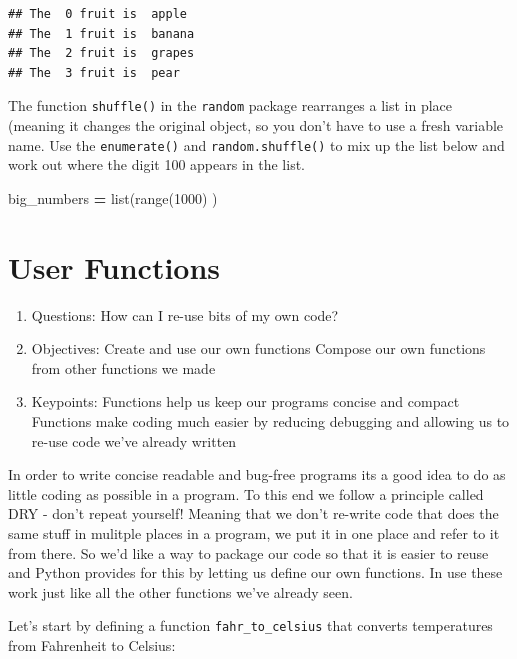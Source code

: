 \documentclass[]{book}
\newenvironment{Shaded}{\begin{snugshade}}{\end{snugshade}}
\newcommand{\BuiltInTok}[1]{#1}
\newcommand{\DecValTok}[1]{\textcolor[rgb]{0.00,0.00,0.81}{#1}}
\newcommand{\NormalTok}[1]{#1}
\newcommand{\OperatorTok}[1]{\textcolor[rgb]{0.81,0.36,0.00}{\textbf{#1}}}
\providecommand{\tightlist}{%
  \setlength{\itemsep}{0pt}\setlength{\parskip}{0pt}}
\theoremstyle{definition}
\theoremstyle{definition}
\theoremstyle{definition}
\theoremstyle{remark}
\begin{document}
\begin{verbatim}
## The  0 fruit is  apple
## The  1 fruit is  banana
## The  2 fruit is  grapes
## The  3 fruit is  pear
\end{verbatim}

The function \texttt{shuffle()} in the \texttt{random} package
rearranges a list in place (meaning it changes the original object, so
you don't have to use a fresh variable name. Use the
\texttt{enumerate()} and \texttt{random.shuffle()} to mix up the list
below and work out where the digit 100 appears in the list.

\begin{Shaded}
\begin{Highlighting}[]
\NormalTok{big_numbers }\OperatorTok{=} \BuiltInTok{list}\NormalTok{(}\BuiltInTok{range}\NormalTok{(}\DecValTok{1000}\NormalTok{) )}
\end{Highlighting}
\end{Shaded}

\hypertarget{user-functions}{%
\chapter{User Functions}\label{user-functions}}

\begin{enumerate}
\def\labelenumi{\arabic{enumi}.}
\tightlist
\item
  Questions: How can I re-use bits of my own code?
\item
  Objectives: Create and use our own functions Compose our own functions
  from other functions we made
\item
  Keypoints: Functions help us keep our programs concise and compact
  Functions make coding much easier by reducing debugging and allowing
  us to re-use code we've already written
\end{enumerate}

In order to write concise readable and bug-free programs its a good idea
to do as little coding as possible in a program. To this end we follow a
principle called DRY - don't repeat yourself! Meaning that we don't
re-write code that does the same stuff in mulitple places in a program,
we put it in one place and refer to it from there. So we'd like a way to
package our code so that it is easier to reuse and Python provides for
this by letting us define our own functions. In use these work just like
all the other functions we've already seen.

Let's start by defining a function \texttt{fahr\_to\_celsius} that
converts temperatures from Fahrenheit to Celsius:
\end{document}
